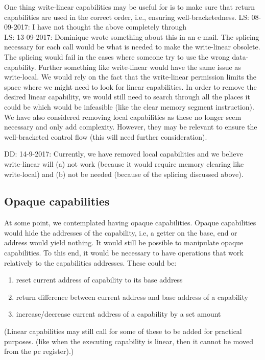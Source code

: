 \documentclass[a3paper]{article}
\newcommand\lau[1]{{\color{purple} \sf \footnotesize {LS: #1}}\\}
\newcommand\dominique[1]{{\color{purple} \sf \footnotesize {DD: #1}}\\}
\begin{document}
One thing write-linear capabilities may be useful for is to make sure that return capabilities are used in the correct order, i.e., ensuring well-bracketedness. 
\lau{08-09-2017: I have not thought the above completely through} 
\lau{13-09-2017: Dominique wrote something about this in an e-mail. The splicing necessary for each call would be what is needed to make the write-linear obsolete. The splicing would fail in the cases where someone try to use the wrong data-capability. Further something like write-linear would have the same issue as write-local. We would rely on the fact that the write-linear permission limits the space where we might need to look for linear capabilities. In order to remove the desired linear capability, we would still need to search through all the places it could be which would be infeasible (like the clear memory segment instruction).}

We have also considered removing local capabilities as these no longer seem necessary and only add complexity. However, they may be relevant to ensure the well-bracketed control flow (this will need further consideration).

\dominique{14-9-2017: Currently, we have removed local capabilities and we believe write-linear will (a) not work (because it would require memory clearing like write-local) and (b) not be needed (because of the splicing discussed above).}


\subsection{Opaque capabilities}
At some point, we contemplated having opaque capabilities. Opaque capabilities would hide the addresses of the capability, i.e, a getter on the base, end or address would yield nothing. It would still be possible to manipulate opaque capabilities. To this end, it would be necessary to have operations that work relatively to the capabilities addresses. These could be: 
\begin{enumerate}
\item reset current address of capability to its base address
\item return difference between current address and base address of a capability
\item increase/decrease current address of a capability by a set amount
\end{enumerate}
(Linear capabilities may still call for some of these to be added for practical purposes. (like when the executing capability is linear, then it cannot be moved from the pc register).)
\end{document}
